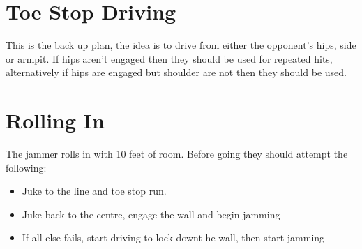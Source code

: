 \documentclass{journal}
\begin{document}
\section*{Toe Stop Driving}
\label{drill:active_blocking:drive}
This is the back up plan, the idea is to drive from either the opponent's hips, side or armpit. 
If hips aren't engaged then they should be used for repeated hits, alternatively if hips are engaged but shoulder are not then they should be used.

\section*{Rolling In}
\label{drill:active_blocking:rolling_in}

The jammer rolls in with 10 feet of room. 
Before going they should attempt the following: 
\begin{itemize}
\item Juke to the line and toe stop run.
\item Juke back to the centre, engage the wall and begin jamming 
\item If all else fails, start driving to lock downt he wall, then start jamming
\end{itemize}
\end{document}
